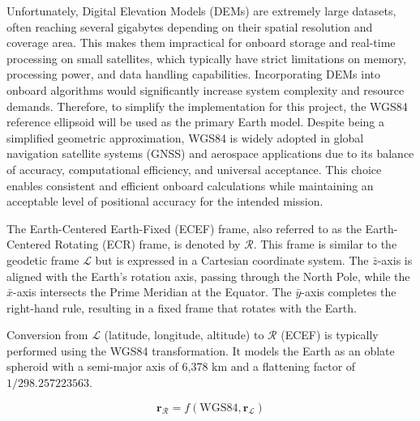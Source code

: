 \noindent Unfortunately, Digital Elevation Models (DEMs) are extremely large datasets, often reaching several gigabytes 
depending on their spatial resolution and coverage area. This makes them impractical for onboard storage and real-time processing on 
small satellites, which typically have strict limitations on memory, processing power, and data handling capabilities. Incorporating DEMs into onboard 
algorithms would significantly increase system complexity and resource demands. Therefore, to simplify the implementation for this project,
the WGS84 reference ellipsoid will be used as the primary Earth model. Despite being a simplified geometric approximation, WGS84 is widely adopted in global 
navigation satellite systems (GNSS) and aerospace applications due to its balance of accuracy, computational efficiency, and universal acceptance. 
This choice enables consistent and efficient onboard calculations while maintaining an acceptable level of positional accuracy for the intended mission.



\noindent The Earth-Centered Earth-Fixed (ECEF) frame, also referred to as the Earth-Centered Rotating (ECR) frame, is denoted by $\mathcal{R}$. This 
frame is similar to the geodetic frame $\mathcal{L}$ but is expressed in a Cartesian coordinate system. The $\bar{z}$-axis is aligned with the Earth's rotation axis, 
passing through the North Pole, while the $\bar{x}$-axis intersects the Prime Meridian at the Equator. The $\bar{y}$-axis completes the right-hand rule, resulting in a fixed 
frame that rotates with the Earth.
\vspace{0.5cm}

\noindent Conversion from $\mathcal{L}$ (latitude, longitude, altitude) to $\mathcal{R}$ (ECEF) is typically performed using the WGS84 transformation. It models the Earth as an oblate 
spheroid with a semi-major axis of 6,378 km and a flattening factor of $1/298.257223563$.

\begin{equation}
       \mathbf{r}_\mathcal{R} = f(\text{WGS84},\mathbf{r}_\mathcal{L})
\end{equation}

